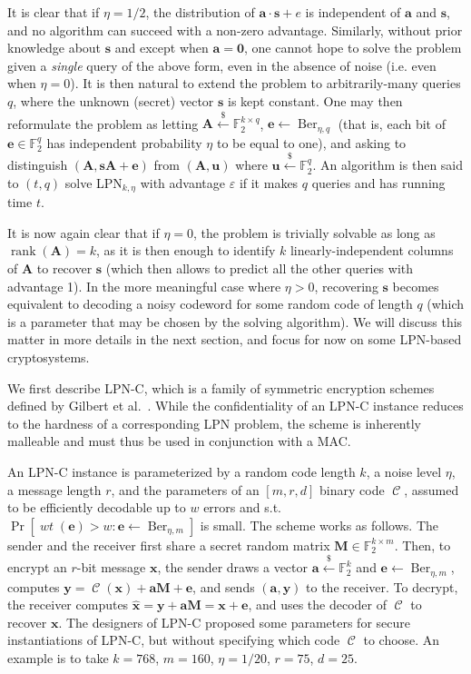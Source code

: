 \documentclass[11pt,a4paper]{article}
\theoremstyle{definition}
\DeclareMathOperator\code{\mathcal{C}}
\DeclareMathOperator\wt{\mathit{wt}}
\DeclareMathOperator\Ber{Ber}
\DeclareMathOperator\rank{rank}
\newcommand\ftwo{\mathbb{F}_{2}}
\newcommand\randraw{\xleftarrow{{\scriptscriptstyle\$}}}
\begin{document}
It is clear that if $\eta = 1/2$, the distribution of $\bm{a}\cdot\bm{s} + e$ is independent of $\bm{a}$ and $\bm{s}$, and no algorithm
can succeed with a non-zero advantage. Similarly, without prior knowledge about $\bm{s}$ and except when $\bm{a} = \bm{0}$, one cannot hope
to solve the problem given a \emph{single} query of the above form, even in the absence of noise (i.e. even when $\eta = 0$). It is then natural to extend the problem to arbitrarily-many queries $q$, where
the unknown (secret) vector $\bm{s}$ is kept constant. One may then reformulate the problem as letting $\bm{A} \randraw \ftwo^{k\times q}$,
$\bm{e} \leftarrow \Ber_{\eta,q}$ (that is, each bit of $\bm{e} \in \ftwo^q$ has independent probability $\eta$ to be equal to one), and asking to distinguish
$(\bm{A},\bm{s}\bm{A} + \bm{e})$ from $(\bm{A}, \bm{u})$ where $\bm{u} \randraw \ftwo^q$. An algorithm is then said to $(t,q)$ solve LPN$_{k,\eta}$ with advantage $\varepsilon$
if it makes $q$ queries and has running time $t$.

It is now again clear that if $\eta = 0$, the problem is trivially solvable as long as $\rank(\bm{A}) = k$, as it is then enough to identify $k$ linearly-independent columns of $\bm{A}$ to recover
$\bm{s}$ (which then allows to predict all the other queries with advantage 1). In the more meaningful case where $\eta > 0$, recovering $\bm{s}$ becomes equivalent to decoding a noisy codeword for
some random code of length $q$ (which is a parameter that may be chosen by the solving algorithm).
We will discuss this matter in more details in the next section, and focus for now on some LPN-based cryptosystems.

\bigskip

We first describe LPN-C, which is a family of symmetric encryption schemes defined by Gilbert et al.~\cite{LPNC}. While the confidentiality of an LPN-C instance reduces to the hardness of a corresponding
LPN problem, the scheme is inherently malleable and must thus be used in conjunction with a MAC.

An LPN-C instance is parameterized by a random code length $k$, a noise level $\eta$, a message length $r$, and the parameters of an $[m,r,d]$ binary code $\code$, assumed to be efficiently decodable up to $w$ errors and s.t. $\Pr[\wt(\bm{e}) > w : \bm{e} \leftarrow \Ber_{\eta,m}]$
is small.
The scheme works as follows. The sender and the receiver first share a secret random matrix $\bm{M} \in \ftwo^{k\times m}$. Then, to encrypt an $r$-bit message $\bm{x}$, the sender
draws a vector $\bm{a} \randraw \ftwo^k$ and $\bm{e} \leftarrow \Ber_{\eta,m}$, computes $\bm{y} = \code(\bm{x}) + \bm{a}\bm{M} + \bm{e}$, and sends $(\bm{a},\bm{y})$ to the receiver.
To decrypt, the receiver computes $\hat{\bm{x}} = \bm{y} + \bm{a}\bm{M} = \bm{x} + \bm{e}$, and uses the decoder of $\code$ to recover $\bm{x}$.
The designers of LPN-C proposed some parameters for secure instantiations of LPN-C, but without specifying which code $\code$ to choose. An example is to take $k = 768$, $m = 160$, $\eta = 1/20$, $r = 75$, $d = 25$.
\end{document}
